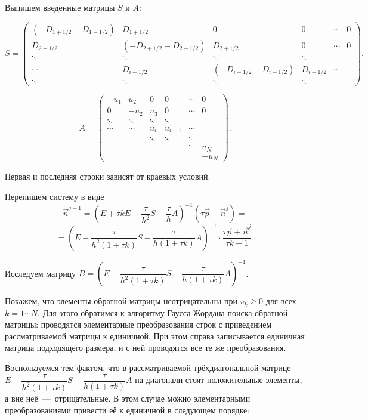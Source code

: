 \documentclass[14pt, a4paper, fleqn, twoside]{extreport}
\theoremstyle{definiton}
\theoremstyle{definition}
\let\geq\geqslant
\begin{document}
Выпишем введенные матрицы $S$ и $A$:

$$S = \left(\begin{smallmatrix}
(-D_{1+1/2}-D_{1-1/2}) & D_{1+1/2}             & 0        & 0  & \cdots & 0 \\
D_{2-1/2}              & (-D_{2+1/2}-D_{2-1/2}) & D_{2+1/2} & 0  & \cdots & 0 \\         
\ddots & \ddots & \ddots & \ddots \\
\cdots & D_{i-1/2} & (-D_{i+1/2}-D_{i-1/2}) & D_{i+1/2} &  \cdots &  \\
\ddots & \ddots & \ddots & \ddots
\end{smallmatrix}\right).$$

$$A=\left(\begin{matrix}
-u_1 &  u_2 & 0   & 0  & \cdots & 0 \\
0    & -u_2 & u_3 & 0  & \cdots & 0 \\         
\ddots & \ddots & \ddots & \ddots \\
\cdots & \cdots & u_i & u_{i+1} &  \cdots &  \\
& & \ddots & \ddots & \ddots\\
& & & & \ddots& u_N\\
& & & & & -u_N
\end{matrix}\right).$$

\smallskip

Первая и последняя строки зависят от краевых условий.

Перепишем систему в виде $$\vec{n}^{j+1}=(E+\tau k E-\dfrac{\tau}{h^2} S-\dfrac{\tau}{h}A)^{-1}(\tau \vec{p}+\vec{n}^j)=$$ $$=\left(E-\dfrac{\tau}{h^2(1+\tau k)}S-\dfrac{\tau}{h(1+\tau k)}A\right)^{-1}\cdot \dfrac{\tau \vec{p}+\vec{n}^j}{\tau k + 1}.$$

Исследуем матрицу $B=\left(E-\dfrac{\tau}{h^2(1+\tau k)}S-\dfrac{\tau}{h(1+\tau k)}A\right)^{-1}$. 

\smallskip
Покажем, что элементы обратной матрицы неотрицательны при $v_k\geq 0$ для всех $k=1\cdots N$. Для этого обратимся к алгоритму Гаусса-Жордана поиска обратной матрицы: проводятся элементарные преобразования строк с приведением рассматриваемой матрицы к единичной. При этом справа записывается единичная матрица подходящего размера, и с ней проводятся все те же преобразования.

\smallskip
Воспользуемся тем фактом, что в рассматриваемой трёхдиагональной матрице $E-\dfrac{\tau}{h^2(1+\tau k)}S-\dfrac{\tau}{h(1+\tau k)}A$ на диагонали стоят положительные элементы, а вне неё~---~отрицательные. В этом случае можно элементарными преобразованиями привести её к единичной в следующем порядке:
\end{document}
